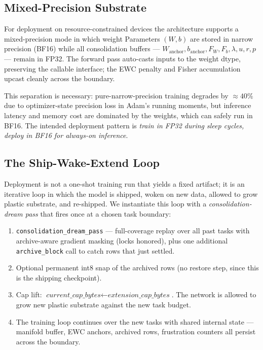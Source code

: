 \documentclass[11pt]{article}
\newcommand{\anchorW}{W_{\text{anchor}}}
\newcommand{\anchorB}{b_{\text{anchor}}}
\begin{document}
\subsection{Mixed-Precision Substrate}
\label{sec:mixed-precision}

For deployment on resource-constrained devices the architecture supports a
mixed-precision mode in which weight Parameters $(W, b)$ are stored in
narrow precision (BF16) while all consolidation buffers ---
$\anchorW, \anchorB, F_W, F_b, \lambda, u, r, p$ --- remain in FP32. The
forward pass auto-casts inputs to the weight dtype, preserving the
callable interface; the EWC penalty and Fisher accumulation upcast cleanly
across the boundary.

This separation is necessary: pure-narrow-precision training degrades by
$\approx\!40\%$ due to optimizer-state precision loss in Adam's running
moments, but inference latency and memory cost are dominated by the
weights, which can safely run in BF16. The intended deployment pattern is
\emph{train in FP32 during sleep cycles, deploy in BF16 for always-on
inference}.

\subsection{The Ship-Wake-Extend Loop}
\label{sec:ship-wake-extend}

Deployment is not a one-shot training run that yields a fixed artifact; it
is an iterative loop in which the model is shipped, woken on new data,
allowed to grow plastic substrate, and re-shipped. We instantiate this
loop with a \emph{consolidation-dream pass} that fires once at a chosen
task boundary:
\begin{enumerate}[leftmargin=2em]
  \item \texttt{consolidation\_dream\_pass} --- full-coverage replay over
        all past tasks with archive-aware gradient masking (locks
        honored), plus one additional \texttt{archive\_block} call to
        catch rows that just settled.
  \item Optional permanent int8 snap of the archived rows (no restore
        step, since this is the shipping checkpoint).
  \item Cap lift:
        $\textit{current\_cap\_bytes} \leftarrow \textit{extension\_cap\_bytes}$.
        The network is allowed to grow new plastic substrate against the
        new task budget.
  \item The training loop continues over the new tasks with shared
        internal state --- manifold buffer, EWC anchors, archived rows,
        frustration counters all persist across the boundary.
\end{enumerate}
\end{document}
